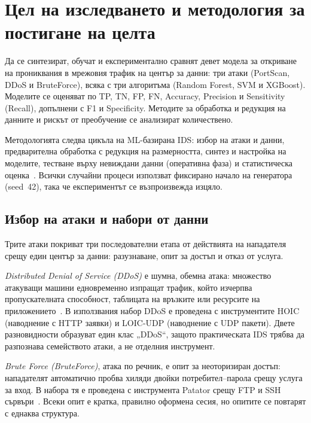 \chapter{Цел на изследването и методология за постигане на целта}\label{ch:method}

\begin{keybox}
Да се синтезират, обучат и експериментално сравнят девет модела за откриване на прониквания в мрежовия трафик на център за данни: три атаки (PortScan, DDoS и BruteForce), всяка с три алгоритъма (Random Forest, SVM и XGBoost). Моделите се оценяват по TP, TN, FP, FN, Accuracy, Precision и Sensitivity (Recall), допълнени с F1 и Specificity. Методите за обработка и редукция на данните и рискът от преобучение се анализират количествено.
\end{keybox}

Методологията следва цикъла на ML-базирана IDS: избор на атаки и данни, предварителна обработка с редукция на размерността, синтез и настройка на моделите, тестване върху невиждани данни (оперативна фаза) и статистическа оценка~\cite{buczak2016,arp2022}. Всички случайни процеси използват фиксирано начало на генератора (seed~42), така че експериментът се възпроизвежда изцяло.

\section{Избор на атаки и набори от данни}\label{sec:attacks}

Трите атаки покриват три последователни етапа от действията на нападателя срещу един център за данни: разузнаване, опит за достъп и отказ от услуга.

\emph{Distributed Denial of Service (DDoS)} е шумна, обемна атака: множество атакуващи машини едновременно изпращат трафик, който изчерпва пропускателната способност, таблицата на връзките или ресурсите на приложението~\cite{mirkovic2004}. В използвания набор DDoS е проведена с инструментите HOIC (наводнение с HTTP заявки) и LOIC-UDP (наводнение с UDP пакети). Двете разновидности образуват един клас „DDoS“, защото практическата IDS трябва да разпознава семейството атаки, а не отделния инструмент.

\emph{Brute Force (BruteForce)}, атака по речник, е опит за неоторизиран достъп: нападателят автоматично пробва хиляди двойки потребител--парола срещу услуга за вход. В набора тя е проведена с инструмента Patator срещу FTP и SSH сървъри~\cite{sharafaldin2018}. Всеки опит е кратка, правилно оформена сесия, но опитите се повтарят с еднаква структура.

